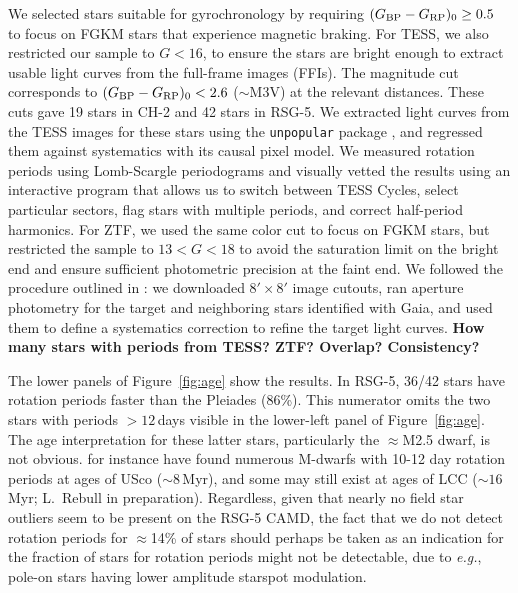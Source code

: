 \documentclass[12pt,twocolumn,linenumbers]{aastex63}
\newcommand{\bpmrpo}{(G_{\rm BP}-G_{\rm RP})_0}
\begin{document}
We selected stars suitable for gyrochronology by requiring $\bpmrpo
\geq 0.5$ to focus on FGKM stars that experience magnetic braking.
For TESS, we also restricted our sample to $G<16$, to ensure the stars
are bright enough to extract usable light curves from the full-frame
images (FFIs).  The magnitude cut corresponds to $\bpmrpo < 2.6$
($\sim$M3V) at the relevant distances.  These cuts gave 19 stars in
CH-2 and 42 stars in RSG-5.  We extracted light curves from the TESS
images for these stars using the \texttt{unpopular} package
\citep{hattorio_2021_cpm}, and regressed them against systematics with
its causal pixel model.  We measured rotation periods using
Lomb-Scargle periodograms and visually vetted the results using an
interactive program that allows us to switch between TESS Cycles,
select particular sectors, flag stars with multiple periods, and
correct half-period harmonics. For ZTF, we used the same color cut to
focus on FGKM stars, but restricted the sample to $13 < G < 18$ to
avoid the saturation limit on the bright end and ensure sufficient
photometric precision at the faint end. We followed the procedure
outlined in \citet{curtis_rup147_2020}: we downloaded $8'\times8'$
image cutouts, ran aperture photometry for the target and neighboring
stars identified with Gaia, and used them to define a systematics
correction to refine the target light curves. 
{\bf How many stars with periods from TESS? ZTF? Overlap?
Consistency? }


The lower panels of Figure~\ref{fig:age} show the results.  In RSG-5,
36/42 stars have rotation periods faster than the Pleiades (86\%).
This numerator omits the two stars with periods $>12$\,days visible in
the lower-left panel of Figure~\ref{fig:age}.  The age interpretation
for these latter stars, particularly the $\approx$M2.5 dwarf, is not
obvious.  \citet{rebull_usco_2018} for instance have found numerous
M-dwarfs with 10-12 day rotation periods at ages of USco ($\sim
8$\,Myr), and some may still exist at ages of LCC ($\sim 16$\,Myr;
L.~Rebull in preparation).  Regardless, given that nearly no field
star outliers seem to be present on the RSG-5 CAMD, the fact that we
do not detect rotation periods for $\approx$14\% of stars should
perhaps be taken as an indication for the fraction of stars for
rotation periods might not be detectable, due to {\it e.g.}, pole-on
stars having lower amplitude starspot modulation.
\end{document}
